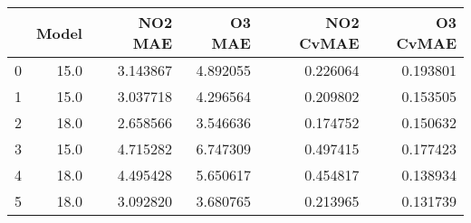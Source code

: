 \begin{tabular}{lrrrrr}
\toprule
{} &  Model &   NO2 MAE &    O3 MAE &  NO2 CvMAE &  O3 CvMAE \\
\midrule
0 &   15.0 &  3.143867 &  4.892055 &   0.226064 &  0.193801 \\
1 &   15.0 &  3.037718 &  4.296564 &   0.209802 &  0.153505 \\
2 &   18.0 &  2.658566 &  3.546636 &   0.174752 &  0.150632 \\
3 &   15.0 &  4.715282 &  6.747309 &   0.497415 &  0.177423 \\
4 &   18.0 &  4.495428 &  5.650617 &   0.454817 &  0.138934 \\
5 &   18.0 &  3.092820 &  3.680765 &   0.213965 &  0.131739 \\
\bottomrule
\end{tabular}
